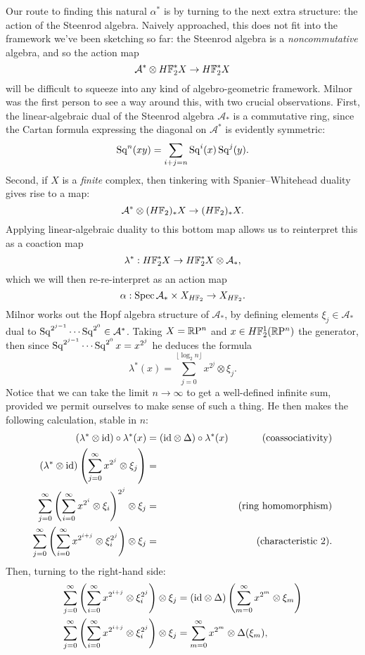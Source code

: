 Our route to finding this natural $\alpha^*$ is by turning to the next extra structure: the action of the Steenrod algebra.  Naively approached, this does not fit into the framework we've been sketching so far: the Steenrod algebra is a \emph{noncommutative} algebra, and so the action map \[\mathcal A^* \otimes H\mathbb F_2^* X \to H\mathbb F_2^* X\] will be difficult to squeeze into any kind of algebro-geometric framework.  Milnor was the first person to see a way around this, with two crucial observations.  First, the linear-algebraic dual of the Steenrod algebra $\mathcal A_*$ is a commutative ring, since the Cartan formula expressing the diagonal on $\mathcal A^*$ is evidently symmetric: \[\operatorname{Sq}^n(x y) = \sum_{i+j=n} \operatorname{Sq}^i(x) \operatorname{Sq}^j(y).\]  Second, if $X$ is a \emph{finite} complex, then tinkering with Spanier--Whitehead duality gives rise to a map: \[\mathcal A^* \otimes (H\mathbb F_2)_* X \to (H\mathbb F_2)_* X.\]  Applying linear-algebraic duality to this bottom map allows us to reinterpret this as a coaction map \[\lambda^*: H\mathbb F_2^* X \to H\mathbb F_2^* X \otimes \mathcal A_*,\] which we will then re-re-interpret as an action map \[\alpha: \operatorname{Spec} \mathcal A_* \times X_{H\mathbb F_2} \to X_{H\mathbb F_2}.\]  Milnor works out the Hopf algebra structure of $\mathcal A_*$, by defining elements $\xi_j \in \mathcal A_*$ dual to $\operatorname{Sq}^{2^{j-1}} \cdots \operatorname{Sq}^{2^0} \in \mathcal A^*$.  Taking $X = \mathbb R\mathrm P^n$ and $x \in H\mathbb F_2^1(\mathbb R\mathrm P^n)$ the generator, then since $\operatorname{Sq}^{2^{j-1}} \cdots \operatorname{Sq}^{2^0} x = x^{2^j}$ he deduces the formula \[\lambda^*(x) = \sum_{j=0}^{\lfloor \log_2 n \rfloor} x^{2^j} \otimes \xi_j.\]  Notice that we can take the limit $n \to \infty$ to get a well-defined infinite sum, provided we permit ourselves to make sense of such a thing.  He then makes the following calculation, stable in $n$:
\begin{align*}
(\lambda^* \otimes \mathrm{id}) \circ \lambda^*(x) & = (\mathrm{id} \otimes \Delta) \circ \lambda^*(x) & \text{(coassociativity)} \\
(\lambda^* \otimes \mathrm{id}) \left( \sum_{j=0}^\infty x^{2^j} \otimes \xi_j \right) & = \\
\sum_{j=0}^\infty \left( \sum_{i=0}^\infty x^{2^i} \otimes \xi_i \right)^{2^j} \otimes \xi_j & = & \text{(ring homomorphism)} \\
\sum_{j=0}^\infty \left( \sum_{i=0}^\infty x^{2^{i+j}} \otimes \xi_i^{2^j} \right) \otimes \xi_j & = & \text{(characteristic $2$)}.
\end{align*}
Then, turning to the right-hand side:
\begin{align*}
\sum_{j=0}^\infty \left( \sum_{i=0}^\infty x^{2^{i+j}} \otimes \xi_i^{2^j} \right) \otimes \xi_j & = (\mathrm{id} \otimes \Delta) \left( \sum_{m=0}^\infty x^{2^m} \otimes \xi_m \right) \\
\sum_{j=0}^\infty \left( \sum_{i=0}^\infty x^{2^{i+j}} \otimes \xi_i^{2^j} \right) \otimes \xi_j & = \sum_{m=0}^\infty x^{2^m} \otimes \Delta(\xi_m),
\end{align*}
